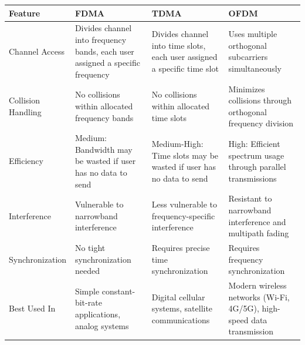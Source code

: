 \documentclass[10pt,landscape]{article}
\newcommand{\1}{\mathmybb{1}}
\begin{document}
\begin{multicols*}{3}
\end{multicols*}




\begin{tabular}{|p{2.5cm}|p{3.5cm}|p{3.5cm}|p{3.5cm}|}
  \hline
  \rowcolor[gray]{0.8}
  \textbf{Feature} & \textbf{FDMA} & \textbf{TDMA} & \textbf{OFDM} \\
  \hline
  Channel Access & Divides channel into frequency bands, each user assigned a specific frequency & Divides channel into time slots, each user assigned a specific time slot & Uses multiple orthogonal subcarriers simultaneously \\
  \hline
  Collision Handling & No collisions within allocated frequency bands & No collisions within allocated time slots & Minimizes collisions through orthogonal frequency division \\
  \hline
  Efficiency & Medium: Bandwidth may be wasted if user has no data to send & Medium-High: Time slots may be wasted if user has no data to send & High: Efficient spectrum usage through parallel transmissions \\
  \hline
  Interference & Vulnerable to narrowband interference & Less vulnerable to frequency-specific interference & Resistant to narrowband interference and multipath fading \\
  \hline
  Synchronization & No tight synchronization needed & Requires precise time synchronization & Requires frequency synchronization \\
  \hline
  Best Used In & Simple constant-bit-rate applications, analog systems & Digital cellular systems, satellite communications & Modern wireless networks (Wi-Fi, 4G/5G), high-speed data transmission \\
  \hline
  \end{tabular}
\end{document}
